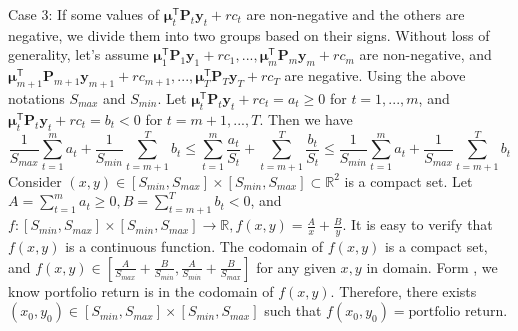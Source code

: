 Case 3: If some values of $\boldsymbol{\mu}_t^{\mathsf{T}}\mathbf{P}_t\mathbf{y}_t + rc_t$ are non-negative and the others are negative, we divide them into two groups based on their signs. Without loss of generality, let's assume $\boldsymbol{\mu}_1^{\mathsf{T}}\mathbf{P}_1 \mathbf{y}_1+rc_1,...,\boldsymbol{\mu}_m^{\mathsf{T}}\mathbf{P}_m\mathbf{y}_m+rc_m$ are non-negative, and $\boldsymbol{\mu}_{m+1}^{\mathsf{T}}\mathbf{P}_{m+1} \mathbf{y}_{m+1}+rc_{m+1},...,\boldsymbol{\mu}_T^{\mathsf{T}}\mathbf{P}_T\mathbf{y}_T+rc_T$ are negative. Using the above notations $S_{max}$ and $S_{min}$. Let $\boldsymbol{\mu}_t^{\mathsf{T}}\mathbf{P}_t \mathbf{y}_t+rc_t=a_t\ge 0$ for $t = 1,...,m$, and $\boldsymbol{\mu}_t^{\mathsf{T}}\mathbf{P}_t \mathbf{y}_t+rc_t=b_t<0$ for $t = m+1,...,T$. Then we have 
\begin{equation}\label{eq:vary_range}
   \frac{1}{S_{max}}\sum_{t=1}^ma_t+\frac{1}{S_{min}}\sum_{t=m+1}^Tb_t\leq \sum_{t=1}^m\frac{a_t}{S_t}+\sum_{t=m+1}^T\frac{b_t}{S_t}\leq \frac{1}{S_{min}}\sum_{t=1}^ma_t+\frac{1}{S_{max}}\sum_{t=m+1}^Tb_t
\end{equation}
Consider $(x,y) \in [S_{min}, S_{max}] \times [S_{min}, S_{max}] \subset \mathbb{R}^2$ is a compact set. Let $A=\sum_{t=1}^ma_t\ge 0, B=\sum_{t=m+1}^Tb_t<0$, and $f:[S_{min}, S_{max}] \times [S_{min}, S_{max}] \rightarrow \mathbb{R}, f(x,y)=\frac{A}{x}+\frac{B}{y}$. It is easy to verify that $f(x,y)$ is a continuous function. The codomain of $f(x,y)$ is a compact set, and $f(x,y) \in \left[\frac{A}{S_{max}}+\frac{B}{S_{min}}, \frac{A}{S_{min}}+\frac{B}{S_{max}} \right]$ for any given $x,y$ in domain. Form \label{eq:vary_range}, we know portfolio return is in the codomain of $f(x,y)$. Therefore, there exists $(x_0,y_0) \in [S_{min}, S_{max}] \times [S_{min}, S_{max}] $ such that $f(x_0,y_0)=\text{portfolio return}$. 

